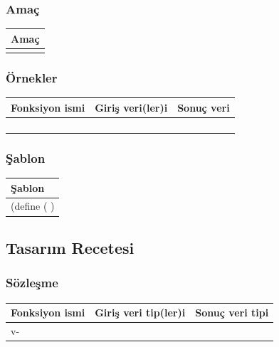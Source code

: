 \documentclass[12pt, a4paper]{article}
\newcommand\fillin[1][3cm]{\makebox[#1]{\dotfill}}
\begin{document}
\subsubsection*{Amaç}
\begin{tabular}{| p{17cm} |  }
\hline			
Amaç\\
\hline
 \\[10ex]
\hline  
\end{tabular}

\subsubsection*{Örnekler}
\begin{tabular}{| p{4cm} | p{8cm} | p{4cm} |  }
\hline			
Fonksiyon ismi&Giriş veri(ler)i&Sonuç veri\\
\hline
& & \\[6ex]
\hline  
& & \\[6ex]
\hline  
& & \\[6ex]
\hline  
& & \\[6ex]
\hline  
\end{tabular}

\subsubsection*{Şablon}
\begin{tabular}{| p{17cm} |  }
\hline			
Şablon\\
\hline
\vspace{0,5cm}
\vspace{0,2cm}
(define (\fillin[2cm] \hspace{1cm}  \fillin[8cm] ) \\[30ex]
\hline  
\end{tabular}






\newpage
\subsection*{Tasarım Recetesi}
\subsubsection*{Sözleşme}
\begin{tabular}{| p{4cm} | p{8cm} | p{4cm} |  }
\hline			
Fonksiyon ismi&Giriş veri tip(ler)i&Sonuç veri tipi\\
\hline
v-& & \\[10ex]
\hline  
\end{tabular}
\end{document}
